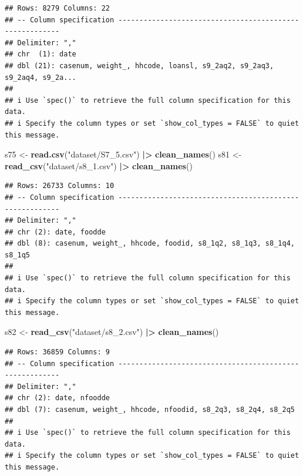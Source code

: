 \documentclass[
]{article}
\newenvironment{Shaded}{\begin{snugshade}}{\end{snugshade}}
\newcommand{\FunctionTok}[1]{\textcolor[rgb]{0.13,0.29,0.53}{\textbf{#1}}}
\newcommand{\NormalTok}[1]{#1}
\newcommand{\OtherTok}[1]{\textcolor[rgb]{0.56,0.35,0.01}{#1}}
\newcommand{\SpecialCharTok}[1]{\textcolor[rgb]{0.81,0.36,0.00}{\textbf{#1}}}
\newcommand{\StringTok}[1]{\textcolor[rgb]{0.31,0.60,0.02}{#1}}
\begin{document}
\begin{verbatim}
## Rows: 8279 Columns: 22
## -- Column specification --------------------------------------------------------
## Delimiter: ","
## chr  (1): date
## dbl (21): casenum, weight_, hhcode, loansl, s9_2aq2, s9_2aq3, s9_2aq4, s9_2a...
## 
## i Use `spec()` to retrieve the full column specification for this data.
## i Specify the column types or set `show_col_types = FALSE` to quiet this message.
\end{verbatim}

\begin{Shaded}
\begin{Highlighting}[]
\NormalTok{s75 }\OtherTok{\textless{}{-}} \FunctionTok{read.csv}\NormalTok{(}\StringTok{"dataset/S7\_5.csv"}\NormalTok{) }\SpecialCharTok{|\textgreater{}} 
  \FunctionTok{clean\_names}\NormalTok{()}
\NormalTok{s81 }\OtherTok{\textless{}{-}} \FunctionTok{read\_csv}\NormalTok{(}\StringTok{"dataset/s8\_1.csv"}\NormalTok{) }\SpecialCharTok{|\textgreater{}} 
  \FunctionTok{clean\_names}\NormalTok{()}
\end{Highlighting}
\end{Shaded}

\begin{verbatim}
## Rows: 26733 Columns: 10
## -- Column specification --------------------------------------------------------
## Delimiter: ","
## chr (2): date, foodde
## dbl (8): casenum, weight_, hhcode, foodid, s8_1q2, s8_1q3, s8_1q4, s8_1q5
## 
## i Use `spec()` to retrieve the full column specification for this data.
## i Specify the column types or set `show_col_types = FALSE` to quiet this message.
\end{verbatim}

\begin{Shaded}
\begin{Highlighting}[]
\NormalTok{s82   }\OtherTok{\textless{}{-}} \FunctionTok{read\_csv}\NormalTok{(}\StringTok{"dataset/s8\_2.csv"}\NormalTok{) }\SpecialCharTok{|\textgreater{}} 
  \FunctionTok{clean\_names}\NormalTok{()}
\end{Highlighting}
\end{Shaded}

\begin{verbatim}
## Rows: 36859 Columns: 9
## -- Column specification --------------------------------------------------------
## Delimiter: ","
## chr (2): date, nfoodde
## dbl (7): casenum, weight_, hhcode, nfoodid, s8_2q3, s8_2q4, s8_2q5
## 
## i Use `spec()` to retrieve the full column specification for this data.
## i Specify the column types or set `show_col_types = FALSE` to quiet this message.
\end{verbatim}
\end{document}
